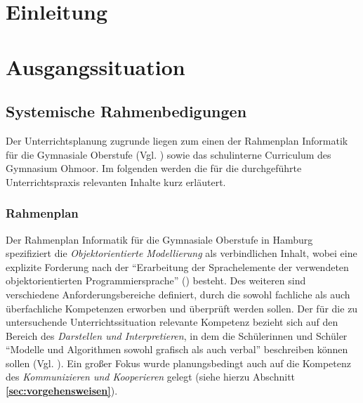 \documentclass[paper=a4, DIV=13, BCOR=12mm, twoside=on, onecolumn=on, open = any, titlepage =on, parskip =half-, headsepline = on, footsepline = on, chapterprefix = on, sectionprefix = on, appendixprefix = off, fontsize = 11pt, numbers = noenddot, abstract = off]{scrreprt}
\begin{document}
\newpage
\thispagestyle{plain}




\thispagestyle{empty}
\newpage
\thispagestyle{empty}

%
%
{}
\newcommand{\hsp}{\hspace{20pt}}
\titleformat{\chapter}[hang]{\Large\bfseries}{\thechapter\hsp\textcolor{gray75}{|}\hsp}{0pt}{\Large\bfseries}

\tableofcontents
\cleardoublepage
{}
\par \singlespacing
{}


\chapter{Einleitung}
\label{sec:einleitung}
\onehalfspacing

\newpage
\par\singlespacing
\chapter{Ausgangssituation}

\par\singlespacing
\section{Systemische Rahmenbedigungen}
\onehalfspacing
Der Unterrichtsplanung zugrunde liegen zum einen der Rahmenplan Informatik für die Gymnasiale Oberstufe (Vgl. \cite{oberstufe:09}) sowie das schulinterne Curriculum des Gymnasium Ohmoor. Im folgenden werden die für die durchgeführte Unterrichtspraxis relevanten Inhalte kurz erläutert.
\subsection{Rahmenplan}
Der Rahmenplan Informatik für die Gymnasiale Oberstufe in Hamburg spezifiziert die \textit{Objektorientierte Modellierung} als verbindlichen Inhalt, wobei eine explizite Forderung nach der "`Erarbeitung der Sprachelemente der verwendeten objektorientierten Programmiersprache"' (\cite[S. 17]{oberstufe:09}) besteht. Des weiteren sind verschiedene Anforderungsbereiche definiert, durch die sowohl fachliche als auch überfachliche Kompetenzen erworben und überprüft werden sollen. Der für die zu untersuchende Unterrichtssituation relevante Kompetenz bezieht sich auf den Bereich des \textit{Darstellen und Interpretieren}, in dem die Schülerinnen und Schüler "`Modelle und Algorithmen sowohl grafisch als auch verbal"' beschreiben können sollen (Vgl. \cite[S.16]{oberstufe:09}). Ein großer Fokus wurde planungsbedingt auch auf die Kompetenz des \textit{Kommunizieren und Kooperieren} gelegt (siehe hierzu Abschnitt \textbf{\ref{sec:vorgehensweisen}}).
\end{document}
